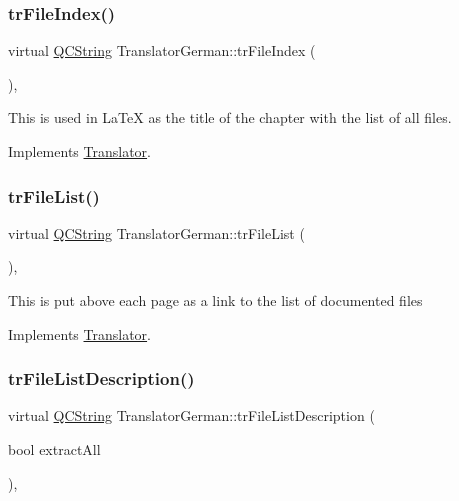 \subsubsection{\texorpdfstring{trFileIndex()}{trFileIndex()}}
{\footnotesize\ttfamily virtual \mbox{\hyperlink{class_q_c_string}{Q\+C\+String}} Translator\+German\+::tr\+File\+Index (\begin{DoxyParamCaption}{ }\end{DoxyParamCaption})\hspace{0.3cm}{\ttfamily [inline]}, {\ttfamily [virtual]}}

This is used in La\+TeX as the title of the chapter with the list of all files. 

Implements \mbox{\hyperlink{class_translator}{Translator}}.

\mbox{\label{class_translator_german_a81569595a6a6ae26668134c61b62755b}} 
\subsubsection{\texorpdfstring{trFileList()}{trFileList()}}
{\footnotesize\ttfamily virtual \mbox{\hyperlink{class_q_c_string}{Q\+C\+String}} Translator\+German\+::tr\+File\+List (\begin{DoxyParamCaption}{ }\end{DoxyParamCaption})\hspace{0.3cm}{\ttfamily [inline]}, {\ttfamily [virtual]}}

This is put above each page as a link to the list of documented files 

Implements \mbox{\hyperlink{class_translator}{Translator}}.

\mbox{\label{class_translator_german_a50894ff741073a056530ebd5df7bfcb5}} 
\subsubsection{\texorpdfstring{trFileListDescription()}{trFileListDescription()}}
{\footnotesize\ttfamily virtual \mbox{\hyperlink{class_q_c_string}{Q\+C\+String}} Translator\+German\+::tr\+File\+List\+Description (\begin{DoxyParamCaption}\item[{bool}]{extract\+All }\end{DoxyParamCaption})\hspace{0.3cm}{\ttfamily [inline]}, {\ttfamily [virtual]}}

